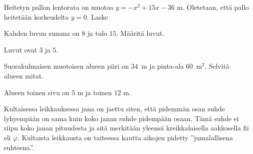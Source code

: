 \begin{tehtavasivu}
\begin{tehtava}
	Heitetyn pallon lentorata on muotoa $y=-x^2+15x-36$ m. Oletetaan, että pallo heitetään korkeudelta $y=0$. Laske
		\begin{alakohdat}
		\end{alakohdat}
	\begin{vastaus}
		\begin{alakohdat}
			\alakohta{9 m}
			\alakohta{3 m}
			\alakohta{12 m}
		\end{alakohdat}
	\end{vastaus}
\end{tehtava}

\begin{tehtava}
    Kahden luvun summa on $8$ ja tulo $15$. Määritä luvut.
    \begin{vastaus}
		Luvut ovat $3$ ja $5$.
    \end{vastaus}
\end{tehtava}

\begin{tehtava}
    Suorakulmaisen muotoisen alueen piiri on $34$~m ja pinta-ala $60$~m$^2$. Selvitä alueen mitat.
    \begin{vastaus}
		Alueen toinen sivu on $5$ m ja toinen $12$ m.
    \end{vastaus}
\end{tehtava}

\begin{tehtava}
    Kultaisessa leikkauksessa jana on jaettu siten, että pidemmän osan suhde lyhyempään on sama kuin koko janan suhde pidempään osaan. Tämä suhde ei riipu koko janan pituudesta ja sitä merkitään yleensä kreikkalaisella aakkosella fii eli $\varphi$. Kultaista leikkausta on taiteessa kautta aikojen pidetty ''jumalallisena suhteena''.
		\begin{alakohdat}
        \end{alakohdat}
    \begin{vastaus}
        \begin{alakohdat}
        \end{alakohdat}
    \end{vastaus}
\end{tehtava}


\end{tehtavasivu}
